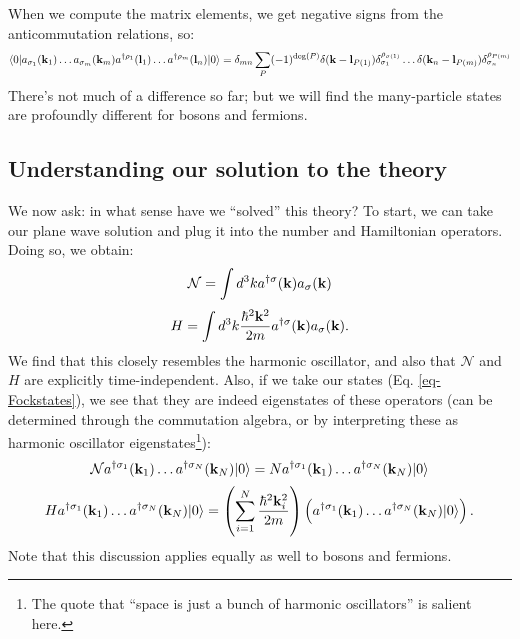 When we compute the matrix elements, we get negative signs from the anticommutation relations, so:
\begin{equation}
    \langle 0 \rvert a_{\sigma_1}(\mathbf{k}_1)\ldots a_{\sigma_m}(\mathbf{k}_m)a^{\dagger\rho_1}(\mathbf{l}_1)\ldots a^{\dagger\rho_m}(\mathbf{l}_n)\lvert 0 \rangle = \delta_{mn}\sum_P (-1)^{\deg(P)}\delta(\mathbf{k} - \mathbf{l}_{P(1)})\delta_{\sigma_1}^{\rho_{\sigma(1)}}\ldots \delta(\mathbf{k}_n - \mathbf{l}_{P(m)})\delta_{\sigma_n}^{\rho_{P(m)}}
\end{equation}
There's not much of a difference so far; but we will find the many-particle states are profoundly different for bosons and fermions.

\subsection{Understanding our solution to the theory}
We now ask: in what sense have we ``solved'' this theory? To start, we can take our plane wave solution and plug it into the number and Hamiltonian operators. Doing so, we obtain:
\begin{equation}
    \mathcal{N} = \int d^3k a^{\dagger\sigma}(\mathbf{k})a_\sigma(\mathbf{k})
\end{equation}
\begin{equation}
    H = \int d^3k\frac{\hbar^2\mathbf{k}^2}{2m}a^{\dagger\sigma}(\mathbf{k})a_\sigma(\mathbf{k}).
\end{equation}
We find that this closely resembles the harmonic oscillator, and also that $\mathcal{N}$ and $H$ are explicitly time-independent. Also, if we take our states (Eq. \eqref{eq-Fockstates}), we see that they are indeed eigenstates of these operators (can be determined through the commutation algebra, or by interpreting these as harmonic oscillator eigenstates\footnote{The quote that ``space is just a bunch of harmonic oscillators'' is salient here.}):
\begin{equation}
    \mathcal{N}a^{\dagger\sigma_1}(\mathbf{k}_1)\ldots a^{\dagger\sigma_N}(\mathbf{k}_N)\lvert 0 \rangle = Na^{\dagger\sigma_1}(\mathbf{k}_1)\ldots a^{\dagger\sigma_N}(\mathbf{k}_N)\lvert 0 \rangle
\end{equation}
\begin{equation}
    Ha^{\dagger\sigma_1}(\mathbf{k}_1)\ldots a^{\dagger\sigma_N}(\mathbf{k}_N)\lvert 0 \rangle = \left(\sum_{i=1}^N \frac{\hbar^2\mathbf{k}_i^2}{2m}\right)\left(a^{\dagger\sigma_1}(\mathbf{k}_1)\ldots a^{\dagger\sigma_N}(\mathbf{k}_N)\lvert 0 \rangle\right).
\end{equation}
Note that this discussion applies equally as well to bosons and fermions.

